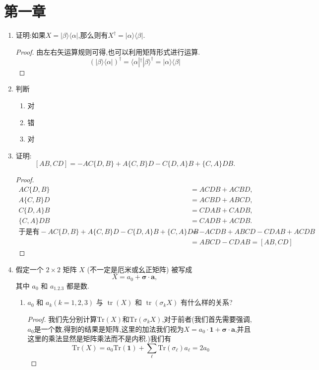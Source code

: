 \section{第一章}
\begin{enumerate}
	\item 证明:如果$X=|\beta\rangle\langle\alpha|$,那么则有$X^\dagger=|\alpha\rangle\langle\beta|$.
	\begin{proof}
		由左右矢运算规则可得,也可以利用矩阵形式进行运算.
		$$(|\beta\rangle\langle\alpha|)^\dagger=\langle\alpha|^\dagger|\beta\rangle^\dagger=|\alpha\rangle\langle\beta|$$
	\end{proof}
	\item 判断
	\begin{enumerate}
		\item 对
		\item 错
		\item 对
	\end{enumerate}
	\item 证明:
	$$
	\left\lbrack {{AB},{CD}}\right\rbrack = - {AC}\{ D, B\} + A\{ C, B\} D - C\{ D, A\} B + \{ C, A\} {D B}.
	$$
	\begin{proof}
	$$
	\begin{aligned}
	AC\{D,B\}&=ACDB+ACBD,\\
	A\{C,B\}D&=ACBD+ABCD,\\
	C\{D,A\}B&=CDAB+CADB,\\ \{C,A\}DB&=CADB+ACDB.\\
	\text{于是有}-AC\{D,B\}+A\{C,B\}D-C\{D,A\}B+\{C,A\}DB&=-ACDB+ABCD-CDAB+ACDB\\&=ABCD-CDAB=[AB,CD]
	\end{aligned}
	$$
	\end{proof}
	\item 假定一个 $2 \times 2$ 矩阵 $X$ (不一定是厄米或幺正矩阵) 被写成
	$$
	X = {a}_{0} + \mathbf{\sigma } \cdot \mathbf{a},
	$$
	其中 ${a}_{0}$ 和 ${a}_{1.2.3}$ 都是数.
	\begin{enumerate}
		\item ${a}_{0}$ 和 ${a}_{k}\left( {k = 1,2,3}\right)$ 与 $\operatorname{tr}\left( X\right)$ 和 $\operatorname{tr}\left( {{\sigma }_{k}X}\right)$ 有什么样的关系?
		\begin{proof}
			我们先分别计算$\mathrm{Tr}(X)$和$\mathrm{Tr}(\sigma_{k}X)$,对于前者(我们首先需要强调,$a_0$是一个数,得到的结果是矩阵,这里的加法我们视为$X = {a}_{0}\cdot \textbf{1} + \mathbf{\sigma } \cdot \mathbf{a}$,并且这里的乘法显然是矩阵乘法而不是内积.)我们有
			\begin{equation}
			\mathrm{Tr}(X)=a_{0} \mathrm{Tr}(\textbf{1})+\sum_{\ell} \mathrm{Tr}(\sigma_{\ell})a_{\ell}=2a_{0}

\end{equation}
\end{proof}
\end{enumerate}
\end{enumerate}
